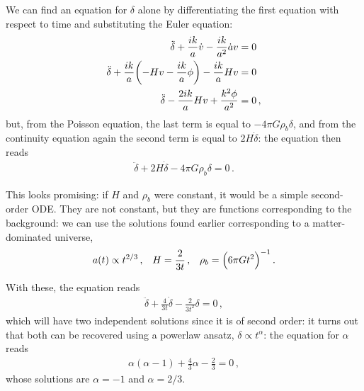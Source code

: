 \documentclass[main.tex]{subfiles}
\begin{document}
We can find an equation for \(\delta \) alone by differentiating the first equation with respect to time and substituting the Euler equation:
%
\begin{subequations}
\begin{align}
  \ddot{\delta} + \frac{ik}{a} \dot{v} - \frac{ik}{a^2}\dot{a} v &= 0  \\
  \ddot{\delta} + \frac{ik}{a} \qty(-Hv - \frac{ik}{a} \phi ) - \frac{ik}{a} Hv &=0  \\
  \ddot{\delta} - \frac{2ik}{a} Hv + \frac{k^2 \phi }{a^2} &=0
\,,
\end{align}
\end{subequations}
%
but, from the Poisson equation, the last term is equal to \(- 4 \pi G \rho_b \delta \), and from the continuity equation again the second term is equal to \(2H \dot{\delta}\): the equation then reads 
%
\begin{align}
  \ddot{\delta} + 2 H \dot{\delta} - 4 \pi G \rho_b \delta = 0 
\,.
\end{align}

This looks promising: if \(H\) and \(\rho _b\) were constant, it would be a simple second-order ODE. 
They are not constant, but they are functions corresponding to the background: we can use the solutions found earlier corresponding to a matter-dominated universe, 
%
\begin{align}
  a(t ) \propto t^{2/3}\,,  &&
  H = \frac{2}{3t}\,,  &&
\rho_b = \qty(6 \pi G t^2)^{-1}
\,.
\end{align}

With these, the equation reads
%
\begin{align}
  \ddot{\delta} + \frac{4}{3t} \dot{\delta} - \frac{2}{3t^2} \delta = 0
\,,
\end{align}
%
which will have two independent solutions since it is of second order: it turns out that both can be recovered using a powerlaw ansatz, \(\delta \propto t^{\alpha }\): the equation for \(\alpha \) reads
%
\begin{align}
  \alpha (\alpha -1) + \frac{4}{3} \alpha - \frac{2}{3} =0 
\,,
\end{align}
%
whose solutions are \(\alpha = -1\) and \(\alpha =  2/3\). 
\end{document}
